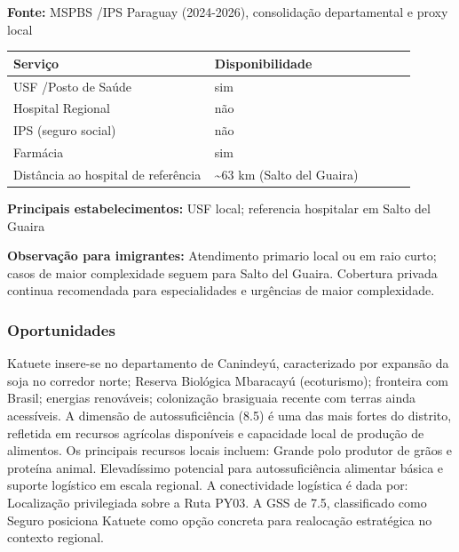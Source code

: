 \textbf{Fonte:} MSPBS /\allowbreak  IPS Paraguay (2024-2026), consolidação
departamental e proxy local

{\def\LTcaptype{none} %
\begin{longtable}{@{}>{\raggedright\arraybackslash}p{0.45\linewidth} >{\raggedright\arraybackslash}p{0.45\linewidth}@{}}
\toprule\noalign{}
Serviço & Disponibilidade \\
\midrule\noalign{}
\endhead
\bottomrule\noalign{}
\endlastfoot
USF /\allowbreak  Posto de Saúde & sim \\
Hospital Regional & não \\
IPS (seguro social) & não \\
Farmácia & sim \\
Distância ao hospital de referência & \textasciitilde63 km (Salto del
Guaira) \\
\end{longtable}
}

\textbf{Principais estabelecimentos:} USF local; referencia hospitalar
em Salto del Guaira

\textbf{Observação para imigrantes:} Atendimento primario local ou em
raio curto; casos de maior complexidade seguem para Salto del Guaira.
Cobertura privada continua recomendada para especialidades e urgências
de maior complexidade.
\newpage

\subsubsection*{Oportunidades}\label{oport-katuete-1408}
Katuete insere-se no departamento de Canindeyú, caracterizado por expansão da soja no corredor norte; Reserva Biológica Mbaracayú (ecoturismo); fronteira com Brasil; energias renováveis; colonização brasiguaia recente com terras ainda acessíveis. A dimensão de autossuficiência (8.5) é uma das mais fortes do distrito, refletida em recursos agrícolas disponíveis e capacidade local de produção de alimentos. Os principais recursos locais incluem: Grande polo produtor de grãos e proteína animal. Elevadíssimo potencial para autossuficiência alimentar básica e suporte logístico em escala regional. A conectividade logística é dada por: Localização privilegiada sobre a Ruta PY03. A GSS de 7.5, classificado como Seguro posiciona Katuete como opção concreta para realocação estratégica no contexto regional.

